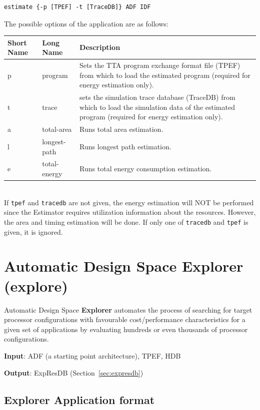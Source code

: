 \documentclass[a4paper,twoside]{tceusermanual}
\begin{document}
\begin{verbatim}
estimate {-p [TPEF] -t [TraceDB]} ADF IDF
\end{verbatim}

The possible options of the application are as follows:\\

\begin{tabular}{p{}p{}
                p{}}
\textbf{Short Name} &\textbf{Long Name} &\textbf{Description} \\
\hline
p & program & Sets the TTA program exchange format file (TPEF) from which to
load the estimated program (required for energy estimation only). \\
t & trace & sets the simulation trace database (TraceDB) from which to load
the simulation data of the estimated program (required for energy estimation
only). \\
a & total-area & Runs total area estimation.\\
l & longest-path & Runs longest path estimation.\\
e & total-energy & Runs total energy consumption estimation.\\
\end{tabular}\\

If \verb|tpef| and \verb|tracedb| are not given, the energy estimation
will NOT be performed since the Estimator requires utilization
information about the resources. However, the area and timing
estimation will be done. If only one of \verb|tracedb| and \verb|tpef|
is given, it is ignored.

\section{Automatic Design Space Explorer (explore)}
\label{section:explore}

Automatic Design Space \textbf{Explorer} automates the
process of searching for target processor configurations with favourable
cost/performance characteristics for a given set of applications by
evaluating hundreds or even thousands of processor configurations.

\textbf{Input}: ADF (a starting point architecture), TPEF, HDB

\textbf{Output}: ExpResDB (Section~\ref{sec:expresdb})

\subsection{Explorer Application format}
\end{document}

